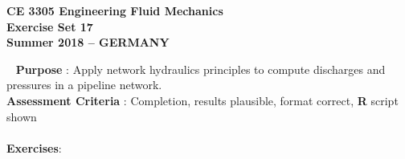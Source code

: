 %
%
%
\begingroup
\begin{center}
{\textbf{{ CE 3305 Engineering Fluid Mechanics} \\ Exercise Set 17 \\ Summer 2018 -- GERMANY} }
\end{center}
\endgroup
\begingroup
~\newline
\textbf{Purpose} : Apply network hydraulics principles to compute discharges and pressures in a pipeline network. \\
\textbf{Assessment Criteria} : Completion, results plausible, format correct, \textbf{R} script shown\\~\\
\textbf{Exercises}:
